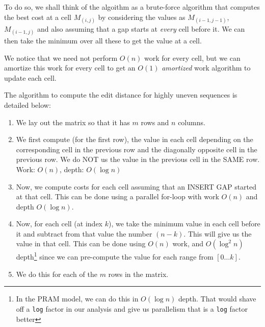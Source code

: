 \documentclass{article}
\begin{document}
To do so, we shall think of the algoithm as a brute-force algorithm
that computes the best cost at a cell $M_{(i,j)}$ by considering the
values as $M_{(i-1,j-1)}$, $M_{(i-1,j)}$ and also assuming that a gap
starts at \textit{every} cell before it. We can then take the minimum
over all these to get the value at a cell.

We notice that we need not perform $O(n)$ work for every cell, but we
can amortize this work for every cell to get an $O(1)$
\textit{amortized} work algorithm to update each cell.

The algorithm to compute the edit distance for highly uneven sequences
is detailed below:

\begin{enumerate}

\item We lay out the matrix so that it has $m$ rows and $n$ columns.

\item We first compute (for the first row), the value in each cell
  depending on the corresponding cell in the previous row and the
  diagonally opposite cell in the previous row. We do NOT us the value
  in the previous cell in the SAME row. Work: $O(n)$, depth: $O(\log{n})$

\item Now, we compute costs for each cell assuming that an INSERT GAP
  started at that cell. This can be done using a parallel for-loop
  with work $O(n)$ and depth $O(\log{n})$.

\item Now, for each cell (at index $k$), we take the minimum value in
  each cell before it and subtract from that value the number
  $(n-k)$. This will give us the value in that cell. This can be done
  using $O(n)$ work, and $O(\log^2{n})$ depth\footnote{In the PRAM
    model, we can do this in $O(\log{n})$ depth. That would shave off
    a \texttt{log} factor in our analysis and give us parallelism that
    is a \texttt{log} factor better} since we can pre-compute the
  value for each range from $[0 \ldots{} k]$.

\item We do this for each of the $m$ rows in the matrix.

\end{enumerate}
\end{document}
